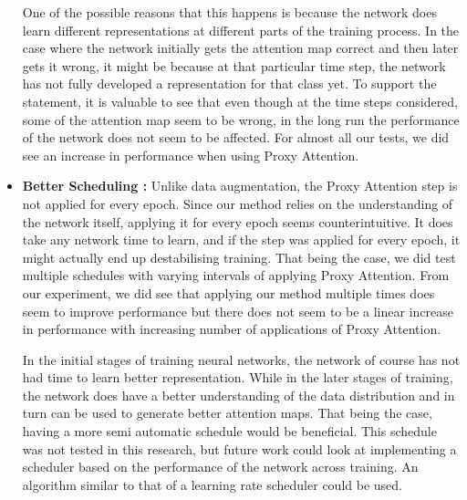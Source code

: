 \documentclass[a4paper,11pt,openright]{book}
\begin{document}
\begin{itemize}
One of the possible reasons that this happens is because the network does learn different representations at different parts of the training process. In the case where the network initially gets the attention map correct and then later gets it wrong, it might be because at that particular time step, the network has not fully developed a representation for that class yet. To support the statement, it is valuable to see that even though at the time steps considered, some of the attention map seem to be wrong, in the long run the performance of the network does not seem to be affected. For almost all our tests, we did see an increase in performance when using Proxy Attention.
\item \textbf{Better Scheduling :} Unlike data augmentation, the Proxy Attention step is not applied for every epoch. Since our method relies on the understanding of the network itself, applying it for every epoch seems counterintuitive. It does take any network time to learn, and if the step was applied for every epoch, it might actually end up destabilising training. That being the case, we did test multiple schedules with varying intervals of applying Proxy Attention. From our experiment, we did see that applying our method multiple times does seem to improve performance but there does not seem to be a linear increase in performance with increasing number of applications of Proxy Attention. 

In the initial stages of training neural networks, the network of course has not had time to learn better representation. While in the later stages of training, the network does have a better understanding of the data distribution and in turn can be used to generate better attention maps. That being the case, having a more semi automatic schedule would be beneficial. This schedule was not tested in this research, but future work could look at implementing a scheduler based on the performance of the network across training. An algorithm similar to that of a learning rate scheduler could be used.
\end{itemize}
\end{document}
